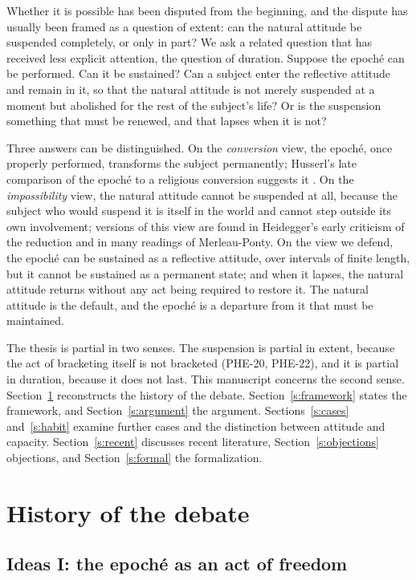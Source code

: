 \documentclass{situationist-preprint}
\begin{document}
Whether it is possible has been disputed from the beginning, and the dispute has usually been framed as a question of extent: can the natural attitude be suspended completely, or only in part? We ask a related question that has received less explicit attention, the question of duration. Suppose the epoché can be performed. Can it be sustained? Can a subject enter the reflective attitude and remain in it, so that the natural attitude is not merely suspended at a moment but abolished for the rest of the subject's life? Or is the suspension something that must be renewed, and that lapses when it is not?

Three answers can be distinguished. On the \emph{conversion} view, the epoché, once properly performed, transforms the subject permanently; Husserl's late comparison of the epoché to a religious conversion suggests it \citep[§35]{Husserl1954}. On the \emph{impossibility} view, the natural attitude cannot be suspended at all, because the subject who would suspend it is itself in the world and cannot step outside its own involvement; versions of this view are found in Heidegger's early criticism of the reduction and in many readings of Merleau-Ponty. On the view we defend, the epoché can be sustained as a reflective attitude, over intervals of finite length, but it cannot be sustained as a permanent state; and when it lapses, the natural attitude returns without any act being required to restore it. The natural attitude is the default, and the epoché is a departure from it that must be maintained.

The thesis is partial in two senses. The suspension is partial in extent, because the act of bracketing itself is not bracketed (PHE-20, PHE-22), and it is partial in duration, because it does not last. This manuscript concerns the second sense. Section~\ref{s:history} reconstructs the history of the debate. Section~\ref{s:framework} states the framework, and Section~\ref{s:argument} the argument. Sections~\ref{s:cases} and~\ref{s:habit} examine further cases and the distinction between attitude and capacity. Section~\ref{s:recent} discusses recent literature, Section~\ref{s:objections} objections, and Section~\ref{s:formal} the formalization.

\section{History of the debate}\label{s:history}

\subsection{Ideas I: the epoché as an act of freedom}
\end{document}
